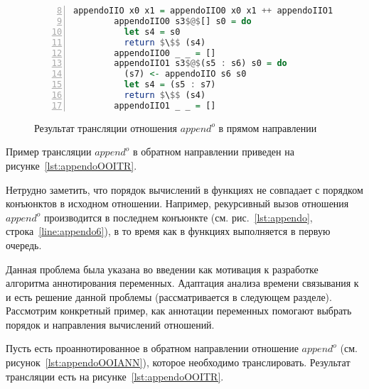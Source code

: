 \begin{figure}[h!]
  \begin{center}
  \begin{minipage}{0.7\textwidth}
  \begin{lstlisting}[language=Haskell, frame=single, numbers=left,numberstyle=\small, firstnumber=8, escapechar=|]
        appendoIIO x0 x1 = appendoIIO0 x0 x1 ++ appendoIIO1 x0 x1
        appendoIIO0 s3$@$[] s0 = do                                  |\label{line:appendoIIOTR2}|
          let s4 = s0
          return $\$$ (s4)
        appendoIIO0 _ _ = []                                         |\label{line:appendoIIOTR5}|
        appendoIIO1 s3$@$(s5 : s6) s0 = do                           |\label{line:appendoIIOTR6}|
          (s7) <- appendoIIO s6 s0
          let s4 = (s5 : s7)
          return $\$$ (s4)
        appendoIIO1 _ _ = []                                         |\label{line:appendoIIOTR10}|
  \end{lstlisting}
  \end{minipage}
  \end{center}
  \caption{Результат трансляции отношения $append^o$ в прямом направлении}
  \label{lst:appendoIIOTR}
\end{figure}

Пример трансляции $append^o$ в обратном направлении приведен на рисунке~\ref{lst:appendoOOITR}.

Нетрудно заметить, что порядок вычислений в функциях не совпадает с порядком конъюнктов в исходном отношении. 
Например, рекурсивный вызов отношения $append^o$ производится в последнем конъюнкте (см. рис.~\ref{lst:appendo}, строка~\ref{line:appendo6}), в то время как в функциях выполняется в первую очередь.

Данная проблема была указана во введении как мотивация к разработке алгоритма аннотирования переменных.
Адаптация анализа времени связывания к \miniKanren{} и есть решение данной проблемы (рассматривается в следующем разделе).
Рассмотрим конкретный пример, как аннотации переменных помогают выбрать порядок и направления вычислений отношений.

Пусть есть проаннотированное в обратном направлении отношение $append^o$ (см. рисунок~\ref{lst:appendoOOIANN}), которое необходимо транслировать.
Результат трансляции есть на рисунке~\ref{lst:appendoOOITR}.

